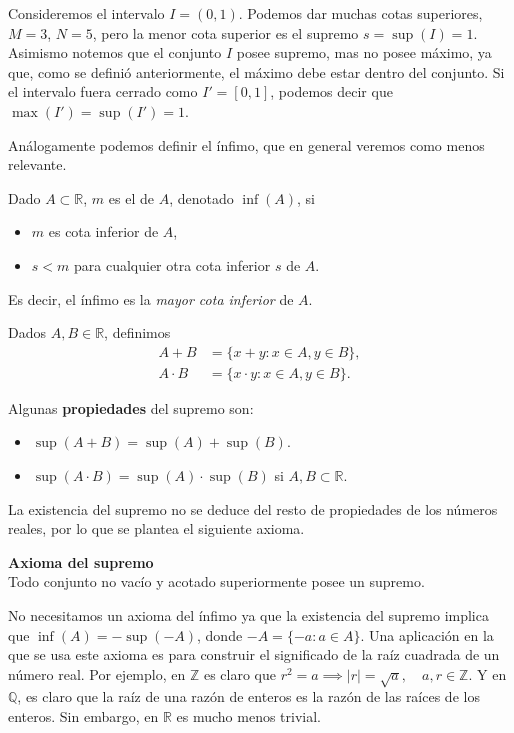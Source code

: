 \documentclass[12pt]{book}
\begin{document}
\begin{exampleenv}
    Consideremos el intervalo $I=(0,1)$.
    Podemos dar muchas cotas superiores, $M=3$, $N=5$, pero la menor cota superior es el supremo $s=\sup(I)=1$. Asimismo notemos que el conjunto $I$ posee supremo, mas no posee máximo, ya que, como se definió anteriormente, el máximo debe estar dentro del conjunto. Si el intervalo fuera cerrado como $I'=[0,1]$, podemos decir que $\max(I')=\sup(I')=1$.
\end{exampleenv}

Análogamente podemos definir el ínfimo, que en general veremos como menos relevante.

\begin{definitionenv}
     Dado $A\subset \mathbb{R}$, $m$ es el  de $A$, denotado $\inf(A)$, si
    \begin{itemize}
        \item $m$ es cota inferior de $A$,
        \item $s < m$ para cualquier otra cota inferior $s$ de $A$.
    \end{itemize}
    Es decir, el ínfimo es la \textit{mayor cota inferior} de $A$.
\end{definitionenv}

Dados $A,B\in \mathbb{R}$, definimos
\begin{align*}
    A+B&=\{x+y: x\in A, y\in B\},\\
    A\cdot B&=\{x\cdot y:x\in A, y\in B\}.
\end{align*}

Algunas \textbf{propiedades} del supremo son:
\begin{itemize}
    \item $\sup(A+B)=\sup(A)+\sup(B)$.
    \item $\sup(A\cdot B)=\sup(A)\cdot \sup(B)$ si $A,B\subset \mathbb{R}$.
\end{itemize}

La existencia del supremo no se deduce del resto de propiedades de los números reales, por lo que se plantea el siguiente axioma.

\begin{axiomenv}
    \textbf{Axioma del supremo}\\
    Todo conjunto no vacío y acotado superiormente posee un supremo.
\end{axiomenv}

No necesitamos un axioma del ínfimo ya que la existencia del supremo implica que $\inf(A)=-\sup(-A)$, donde $-A=\{ -a:a\in A\}$. Una aplicación en la que se usa este axioma es para construir el significado de la raíz cuadrada de un número real. Por ejemplo, en $\mathbb{Z}$ es claro que $r^2=a\implies |r|=\sqrt{a}, \quad a,r\in \mathbb{Z}$. Y en $\mathbb{Q}$, es claro que la raíz de una razón de enteros es la razón de las raíces de los enteros. Sin embargo, en $\mathbb{R}$ es mucho menos trivial.\\
\end{document}
